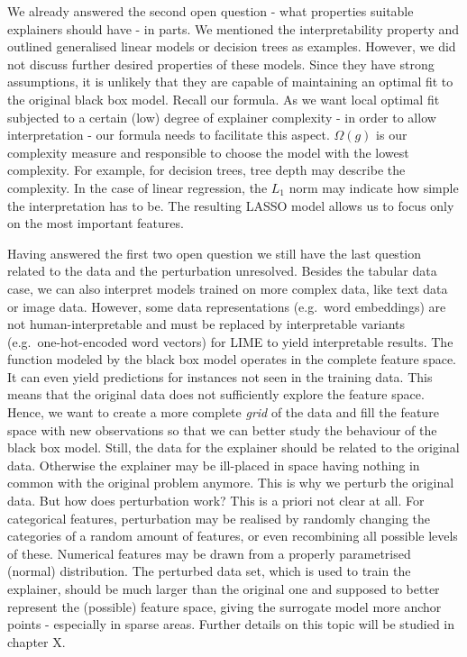 \documentclass[
]{krantz}
\begin{document}
We already answered the second open question - what properties suitable explainers should have - in parts.
We mentioned the interpretability property and outlined generalised linear models or decision trees as examples.
However, we did not discuss further desired properties of these models.
Since they have strong assumptions, it is unlikely that they are capable of maintaining an optimal fit to the original black box model.
Recall our formula.
As we want local optimal fit subjected to a certain (low) degree of explainer complexity - in order to allow interpretation - our formula needs to facilitate this aspect.
\(\Omega\left(g\right)\) is our complexity measure and responsible to choose the model with the lowest complexity.
For example, for decision trees, tree depth may describe the complexity.
In the case of linear regression, the \(L_1\) norm may indicate how simple the interpretation has to be.
The resulting LASSO model allows us to focus only on the most important features.

Having answered the first two open question we still have the last question related to the data and the perturbation unresolved.
Besides the tabular data case, we can also interpret models trained on more complex data, like text data or image data.
However, some data representations (e.g.~word embeddings) are not human-interpretable and must be replaced by interpretable variants (e.g.~one-hot-encoded word vectors) for LIME to yield interpretable results.
The function modeled by the black box model operates in the complete feature space.
It can even yield predictions for instances not seen in the training data.
This means that the original data does not sufficiently explore the feature space.
Hence, we want to create a more complete \emph{grid} of the data and fill the feature space with new observations so that we can better study the behaviour of the black box model.
Still, the data for the explainer should be related to the original data.
Otherwise the explainer may be ill-placed in space having nothing in common with the original problem anymore.
This is why we perturb the original data.
But how does perturbation work?
This is a priori not clear at all.
For categorical features, perturbation may be realised by randomly changing the categories of a random amount of features, or even recombining all possible levels of these.
Numerical features may be drawn from a properly parametrised (normal) distribution.
The perturbed data set, which is used to train the explainer, should be much larger than the original one and supposed to better represent the (possible) feature space, giving the surrogate model more anchor points - especially in sparse areas.
Further details on this topic will be studied in chapter X.
\end{document}
